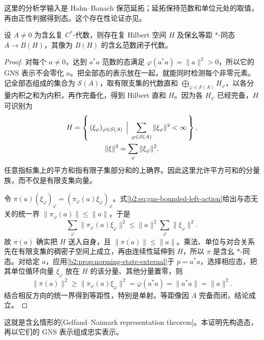 这里的分析学输入是 Hahn--Banach 保范延拓；延拓保持范数和单位元处的取值，再由正性判据得到态。这个存在性论证亦见\cite[\nopp II.6.3.1; Proposition II.6.3.3]{Blackadar2017OperatorAlgebrasCorrected}。

\begin{theorem}\label{b2:thm:gelfand-naimark-unital}
	设 \(A\ne0\) 为含幺复 \(C^*\)-代数，则存在复 Hilbert 空间 \(H\) 及保幺等距 \(*\)-同态 \(A\rightarrow B(H)\)，其像为 \(B(H)\) 的含幺范数闭子代数。
\end{theorem}
\begin{proof}
	对每个 \(a\ne0\)，达到 \(a^*a\) 范数的态满足 \(\varphi(a^*a)=\|a\|^2>0\)，所以它的 GNS 表示不会零化 \(a\)。把全部态的表示放在一起，就能同时检测每个非零元素。记全部态组成的集合为 \(\mathcal S(A)\)，取有限支集的代数直和 \(\bigoplus_{\varphi\in\mathcal S(A)}H_\varphi\)，以各分量内积之和为内积，再作完备化，得到 Hilbert 直和 \(H\)。因为各 \(H_\varphi\) 已经完备，\(H\) 可识别为
	\[
		\begin{gathered}
			H=\left\{\,(\xi_\varphi)_{\varphi\in\mathcal S(A)} \,\Bigm\vert\, \sum_{\varphi\in\mathcal S(A)}\|\xi_\varphi\|^2<\infty\,\right\},
			\\
			\|\xi\|^2=\sum_\varphi\|\xi_\varphi\|^2.
		\end{gathered}
	\]
	任意指标集上的平方和指有限子集部分和的上确界。因此这里允许平方可和的分量族，而不仅是有限支集向量。

	令 \(\pi(a)(\xi_\varphi)_\varphi=(\pi_\varphi(a)\xi_\varphi)_\varphi\)。式\eqref{b2:eq:gns-bounded-left-action}给出与态无关的统一界 \(\|\pi_\varphi(a)\|\le\|a\|\)，于是
	\[
		\sum_\varphi\|\pi_\varphi(a)\xi_\varphi\|^2 \le\|a\|^2\sum_\varphi\|\xi_\varphi\|^2.
	\]
	故 \(\pi(a)\) 确实把 \(H\) 送入自身，且 \(\|\pi(a)\|\le\|a\|\)。乘法、单位与对合关系先在有限支集的稠密子空间上成立，再由连续性延伸到 \(H\)，所以 \(\pi\) 是含幺 \(*\)-同态。对给定 \(a\)，应用\cref{b2:prop:norming-state-external}于 \(p=a^*a\)，选择相应态，把其单位循环向量 \(\xi_\varphi\) 放在 \(H\) 的该分量、其他分量置零，则
	\[
		\bigl\lVert\pi(a)\bigr\rVert^2\ge\bigl\lVert\pi_\varphi(a)\xi_\varphi\bigr\rVert^2 =\varphi(a^*a)=\|a^*a\|=\|a\|^2.
	\]
	结合相反方向的统一界得到等距性，特别是单射。等距像因 \(A\) 完备而闭，结论成立。
\end{proof}

这就是含幺情形的[Gelfand--Naimark representation theorem]。本证明先构造态，再以它们的 GNS 表示组成忠实表示。

